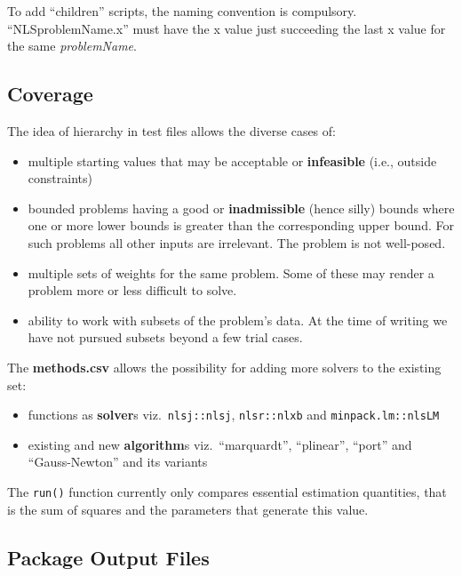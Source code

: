 To add ``children'' scripts, the naming convention is compulsory.
``NLSproblemName.x'' must have the x value just succeeding the last x
value for the same \emph{problemName}.

\hypertarget{coverage}{%
\subsection{Coverage}\label{coverage}}

The idea of hierarchy in test files allows the diverse cases of:

\begin{itemize}
\tightlist
\item
  multiple starting values that may be acceptable or \textbf{infeasible}
  (i.e., outside constraints)
\item
  bounded problems having a good or \textbf{inadmissible} (hence silly)
  bounds where one or more lower bounds is greater than the
  corresponding upper bound. For such problems all other inputs are
  irrelevant. The problem is not well-posed.
\item
  multiple sets of weights for the same problem. Some of these may
  render a problem more or less difficult to solve.
\item
  ability to work with subsets of the problem's data. At the time of
  writing we have not pursued subsets beyond a few trial cases.
\end{itemize}

The \textbf{methods.csv} allows the possibility for adding more solvers
to the existing set:

\begin{itemize}
\tightlist
\item
  functions as \textbf{solver}s viz.~\texttt{nlsj::nlsj},
  \texttt{nlsr::nlxb} and \texttt{minpack.lm::nlsLM}
\item
  existing and new \textbf{algorithm}s viz.~``marquardt'', ``plinear'',
  ``port'' and ``Gauss-Newton'' and its variants
\end{itemize}

The \texttt{run()} function currently only compares essential estimation
quantities, that is the sum of squares and the parameters that generate
this value.

\hypertarget{package-output-files}{%
\subsection{Package Output Files}\label{package-output-files}}

